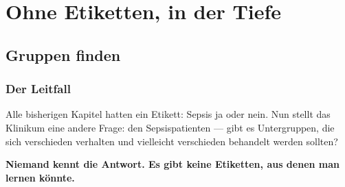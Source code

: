 \part{Ohne Etiketten, in der Tiefe}

\chapter{Gruppen finden}

\section{Der Leitfall}

\begin{merksatz}
Alle bisherigen Kapitel hatten ein Etikett: Sepsis ja oder nein. Nun stellt das Klinikum eine andere Frage:  den Sepsispatienten --- gibt es Untergruppen, die sich verschieden verhalten und vielleicht verschieden behandelt werden sollten?

\begin{center}
\begin{minipage}{0.9\textwidth}
\textbf{Niemand kennt die Antwort. Es gibt keine Etiketten, aus denen man lernen könnte.}
\end{minipage}
\end{center}

\begin{center}
\begin{minipage}{0.88\textwidth}
\end{minipage}
\end{center}
\end{merksatz}

